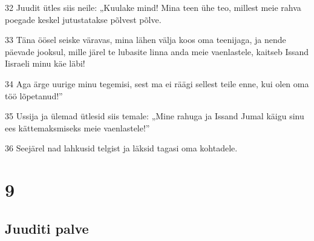 \par 32 Juudit ütles siis neile: „Kuulake mind! Mina teen ühe teo, millest meie rahva poegade keskel jutustatakse põlvest põlve.
\par 33 Täna öösel seiske väravas, mina lähen välja koos oma teenijaga, ja nende päevade jooksul, mille järel te lubasite linna anda meie vaenlastele, kaitseb Issand Iisraeli minu käe läbi!
\par 34 Aga ärge uurige minu tegemisi, sest ma ei räägi sellest teile enne, kui olen oma töö lõpetanud!”
\par 35 Ussija ja ülemad ütlesid siis temale: „Mine rahuga ja Issand Jumal käigu sinu ees kättemaksmiseks meie vaenlastele!”
\par 36 Seejärel nad lahkusid telgist ja läksid tagasi oma kohtadele.


\chapter{9}

\section*{Juuditi palve}

